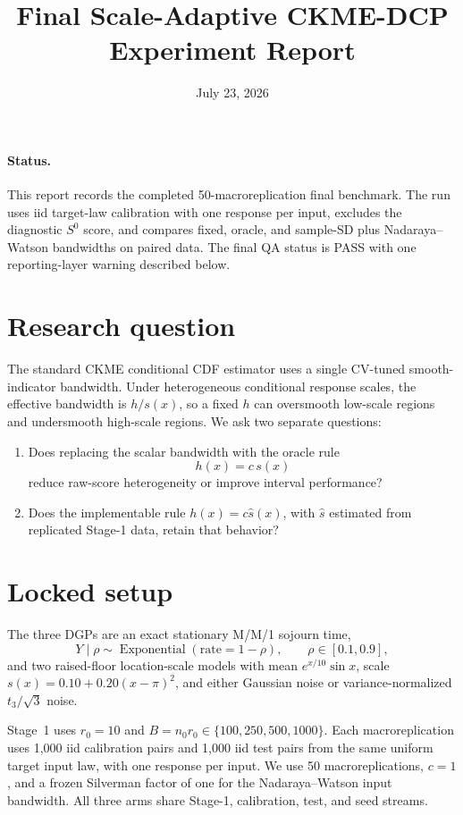 \documentclass[11pt]{article}
\title{Final Scale-Adaptive CKME-DCP Experiment Report}
\author{}
\date{July 23, 2026}
\begin{document}
\maketitle

\paragraph{Status.}
This report records the completed 50-macroreplication final benchmark. The run
uses iid target-law calibration with one response per input, excludes the
diagnostic \(S^0\) score, and compares fixed, oracle, and sample-SD plus
Nadaraya--Watson bandwidths on paired data. The final QA status is PASS with one
reporting-layer warning described below.

\section{Research question}

The standard CKME conditional CDF estimator uses a single CV-tuned smooth-indicator
bandwidth. Under heterogeneous conditional response scales, the effective
bandwidth is \(h/s(x)\), so a fixed \(h\) can oversmooth low-scale regions and
undersmooth high-scale regions. We ask two separate questions:
\begin{enumerate}
  \item Does replacing the scalar bandwidth with the oracle rule
\[
  h(x)=c\,s(x)
\]
  reduce raw-score heterogeneity or improve interval performance?
  \item Does the implementable rule \(h(x)=c\widehat s(x)\), with
  \(\widehat s\) estimated from replicated Stage-1 data, retain that behavior?
\end{enumerate}

\section{Locked setup}

The three DGPs are an exact stationary M/M/1 sojourn time,
\[
  Y\mid\rho\sim\operatorname{Exponential}(\text{rate}=1-\rho),
  \qquad \rho\in[0.1,0.9],
\]
and two raised-floor location-scale models with mean
\(e^{x/10}\sin x\), scale \(s(x)=0.10+0.20(x-\pi)^2\), and either Gaussian
noise or variance-normalized \(t_3/\sqrt{3}\) noise.

Stage~1 uses \(r_0=10\) and
\(B=n_0r_0\in\{100,250,500,1000\}\). Each macroreplication uses 1,000 iid
calibration pairs and 1,000 iid test pairs from the same uniform target input
law, with one response per input. We use 50 macroreplications, \(c=1\), and a
frozen Silverman factor of one for the Nadaraya--Watson input bandwidth. All
three arms share Stage-1, calibration, test, and seed streams.
\end{document}

